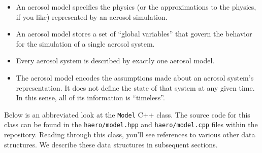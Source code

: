 \begin{itemize}
  \item An aerosol model specifies the physics (or the approximations to the
        physics, if you like) represented by an aerosol simulation.
  \item An aerosol model stores a set of ``global variables'' that govern the
        behavior for the simulation of a single aerosol system.
  \item Every aerosol system is described by exactly one aerosol model.
  \item The aerosol model encodes the assumptions made about an aerosol system's
        representation. It does not define the state of that system at any given
        time. In this sense, all of its information is ``timeless''.
\end{itemize}

Below is an abbreviated look at the \texttt{Model} C++ class. The source code for
this class can be found in the \texttt{haero/model.hpp} and
\texttt{haero/model.cpp} files within the repository. Reading through this class,
you'll see references to various other data structures. We describe these data
structures in subsequent sections.

